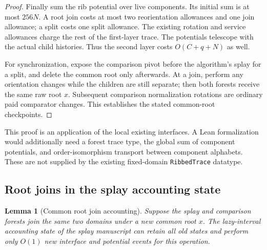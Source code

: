 \documentclass[11pt]{article}
\numberwithin{equation}{section}
\newtheorem{lemma}[theorem]{Lemma}
\begin{document}
\begin{proof}
Finally sum the rib potential over live components. Its initial sum is
at most $256N$. A root join costs at most two reorientation allowances
and one join allowance; a split costs one split allowance. The existing
rotation and service allowances charge the rest of the first-layer
trace. The potentials telescope with the actual child histories.
Thus the second layer costs $O(C+q+N)$ as well.

For synchronization, expose the comparison pivot before the algorithm's
splay for a split, and delete the common root only afterwards. At a
join, perform any orientation changes while the children are still
separate; then both forests receive the same raw root $x$. Subsequent
comparison normalization rotations are ordinary paid comparator changes.
This establishes the stated common-root checkpoints.
\end{proof}

This proof is an application of the local existing interfaces. A Lean
formalization would additionally need a forest trace type, the global
sum of component potentials, and order-isomorphism transport between
component alphabets. These are not supplied by the existing fixed-domain
\texttt{RibbedTrace} datatype.

\subsection{Root joins in the splay accounting state}

\begin{lemma}[Common root join accounting]\label{forest:lem:heap-join}
Suppose the splay and comparison forests join the same two domains
under a new common root $x$. The lazy-interval accounting state of the
splay manuscript can retain all old states and perform only $O(1)$ new
interface and potential events for this operation.
\end{lemma}
\end{document}
